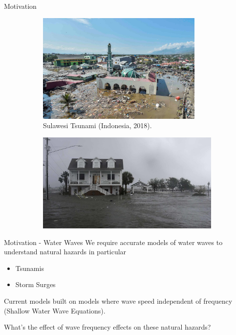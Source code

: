 \documentclass[pdf]{beamer}
\begin{document}
\begin{frame}{Motivation}
\begin{figure}
	\centering
	\begin{subfigure}{0.49\textwidth}
		\includegraphics[width=0.9\textwidth]{./Pics/Web/SualwesiTsunami.jpg}
		\caption{Sulawesi Tsunami (Indonesia, 2018).}
	\end{subfigure}
	\begin{subfigure}{0.49\textwidth}
	\includegraphics[width=1.1\textwidth]{./Pics/Web/HurricaneFlorence.jpg}
	\end{subfigure}
\end{figure}
\end{frame}

\begin{frame}{Motivation - Water Waves}
We require accurate models of water waves to understand natural hazards in particular
\begin{itemize}
	\item Tsunamis
	\item Storm Surges
\end{itemize}
\bigskip
Current models built on models where wave speed independent of frequency (Shallow Water Wave Equations). 
\pause

\bigskip
What's the effect of wave frequency effects on these natural hazards?
\end{frame}
\end{document}
